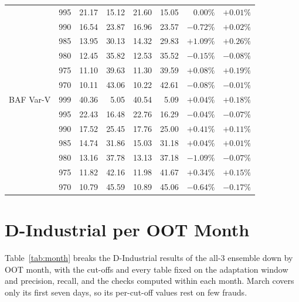 \documentclass[11pt]{article}
\begin{document}
\begin{table}[t]
\begin{tabular}{llrrrrrr}
 & 995 & 21.17 & 15.12 & 21.60 & 15.05 & $0.00\%$ & $+0.01\%$ \\
 & 990 & 16.54 & 23.87 & 16.96 & 23.57 & $-0.72\%$ & $+0.02\%$ \\
 & 985 & 13.95 & 30.13 & 14.32 & 29.83 & $+1.09\%$ & $+0.26\%$ \\
 & 980 & 12.45 & 35.82 & 12.53 & 35.52 & $-0.15\%$ & $-0.08\%$ \\
 & 975 & 11.10 & 39.63 & 11.30 & 39.59 & $+0.08\%$ & $+0.19\%$ \\
 & 970 & 10.11 & 43.06 & 10.22 & 42.61 & $-0.08\%$ & $-0.01\%$ \\
\midrule
BAF Var-V & 999 & 40.36 & 5.05 & 40.54 & 5.09 & $+0.04\%$ & $+0.18\%$ \\
 & 995 & 22.43 & 16.48 & 22.76 & 16.29 & $-0.04\%$ & $-0.07\%$ \\
 & 990 & 17.52 & 25.45 & 17.76 & 25.00 & $+0.41\%$ & $+0.11\%$ \\
 & 985 & 14.74 & 31.86 & 15.03 & 31.18 & $+0.04\%$ & $+0.01\%$ \\
 & 980 & 13.16 & 37.78 & 13.13 & 37.18 & $-1.09\%$ & $-0.07\%$ \\
 & 975 & 11.82 & 42.16 & 11.98 & 41.67 & $+0.34\%$ & $+0.15\%$ \\
 & 970 & 10.79 & 45.59 & 10.89 & 45.06 & $-0.64\%$ & $-0.17\%$ \\
\bottomrule
\end{tabular}
\end{table}

%
\section{D-Industrial per OOT Month}
\label{sec:app_month}

Table~\ref{tab:month} breaks the D-Industrial results of the all-3 ensemble down by OOT month, with
the cut-offs and every table fixed on the adaptation window and precision, recall, and the checks
computed within each month. March covers only its first seven days, so its per-cut-off values rest on
few frauds.
\end{document}
